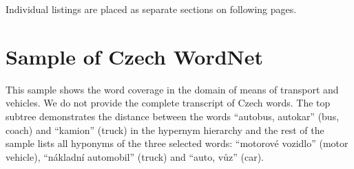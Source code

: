 
Individual listings are placed as separate sections on following pages.

\clearpage
\section{Sample of Czech WordNet}	\label{sec:listing_czWordNet}
This sample shows the word coverage in the domain of means of transport and vehicles. We do not provide the complete transcript of Czech words. The top subtree demonstrates the distance between the words ``autobus, autokar'' (bus, coach) and ``kamion'' (truck) in the hypernym hierarchy and the rest of the sample lists all hyponyms of the three selected words: ``motorové vozidlo'' (motor vehicle), ``nákladní automobil'' (truck) and ``auto, vůz'' (car).

\bigskip

